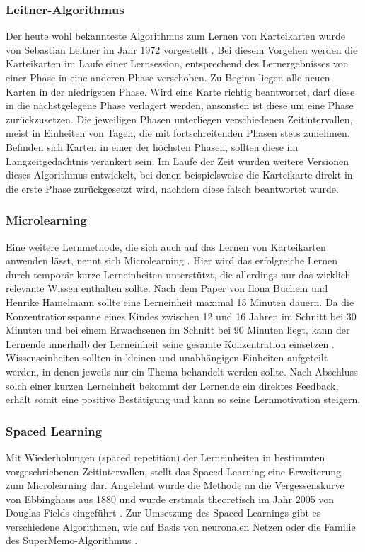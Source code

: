 \subsubsection{Leitner-Algorithmus}
Der heute wohl bekannteste Algorithmus zum Lernen von Karteikarten wurde von Sebastian Leitner im Jahr 1972 vorgestellt \cite{SebastianLeitner.1972}. Bei diesem Vorgehen werden die Karteikarten im Laufe einer Lernsession, entsprechend des Lernergebnisses von einer Phase in eine anderen Phase verschoben. Zu Beginn liegen alle neuen Karten in der niedrigsten Phase. Wird eine Karte richtig beantwortet, darf diese in die nächstgelegene Phase verlagert werden, ansonsten ist diese um eine Phase zurückzusetzen. Die jeweiligen Phasen unterliegen verschiedenen Zeitintervallen, meist in Einheiten von Tagen, die mit fortschreitenden Phasen stets zunehmen. Befinden sich Karten in einer der höchsten Phasen, sollten diese im Langzeitgedächtnis verankert sein. Im  Laufe der Zeit wurden weitere Versionen dieses Algorithmus entwickelt, bei denen beispielsweise die Karteikarte direkt in die erste Phase zurückgesetzt wird, nachdem diese falsch beantwortet wurde.

\subsubsection{Microlearning}
Eine weitere Lernmethode, die sich auch auf das Lernen von Karteikarten anwenden lässt, nennt sich Microlearning \cite{Hug.2005}. Hier wird das erfolgreiche Lernen durch temporär kurze Lerneinheiten unterstützt, die allerdings nur das wirklich relevante Wissen enthalten sollte. Nach dem Paper von Ilona Buchem und Henrike Hamelmann \cite{Buchem.2010} sollte eine Lerneinheit maximal 15 Minuten dauern. Da die Konzentrationsspanne eines Kindes zwischen 12 und 16 Jahren im Schnitt bei 30 Minuten und bei einem Erwachsenen im Schnitt bei 90 Minuten liegt, kann der Lernende innerhalb der Lerneinheit seine gesamte Konzentration einsetzen \cite{konzentrationsspanne}. Wissenseinheiten sollten in kleinen und unabhängigen Einheiten aufgeteilt werden, in denen jeweils nur ein Thema behandelt werden sollte. Nach Abschluss solch einer kurzen Lerneinheit bekommt der Lernende ein direktes Feedback, erhält somit eine positive Bestätigung und kann so seine Lernmotivation steigern.


\subsubsection{Spaced Learning}
Mit Wiederholungen (\glqq spaced repetition\grqq{}) der Lerneinheiten in bestimmten vorgeschriebenen Zeitintervallen, stellt das Spaced Learning eine Erweiterung zum Microlearning dar. Angelehnt wurde die Methode an die Vergessenskurve von Ebbinghaus aus 1880 und wurde erstmals theoretisch im Jahr 2005 von Douglas Fields eingeführt \cite{Fields.2005}. Zur Umsetzung des Spaced Learnings gibt es verschiedene Algorithmen, wie auf Basis von neuronalen Netzen \cite{BartoszDregerPiotrWozniak.1998} oder die Familie des SuperMemo-Algorithmus \cite{supermemo}. \\



